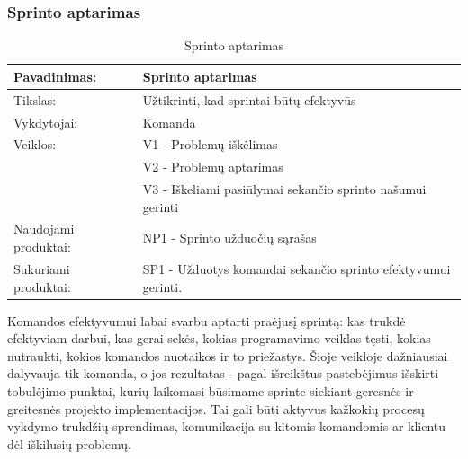 \documentclass{VUMIFPSkursinis}
\begin{document}
	\subsubsection{Sprinto aptarimas}
	\begin{center}
		\begin{table}[ht]
		\caption{Sprinto aptarimas}
		\begin{tabular}{ | l | l | } 
		\hline
		Pavadinimas:         & Sprinto aptarimas                               \\ \hline
		Tikslas: 	           & Užtikrinti, kad sprintai būtų efektyvūs\\ \hline
		Vykdytojai:          & Komanda                                \\ \hline
		Veiklos:             & V1 - Problemų iškėlimas 													\\ 
						             & V2 - Problemų aptarimas \\ 
					 	             & V3 - Iškeliami pasiūlymai sekančio sprinto našumui gerinti 																			 \\ \hline
		Naudojami produktai: & NP1 - Sprinto užduočių sąrašas 																																															 \\ \hline
		Sukuriami produktai: & SP1 - Užduotys komandai sekančio sprinto efektyvumui gerinti.																											\\ \hline
		\end{tabular}
	\end{table}
		\end{center}
	Komandos efektyvumui labai svarbu aptarti praėjusį sprintą: kas trukdė efektyviam darbui, kas gerai sekės, kokias programavimo veiklas tęsti, kokias nutraukti, kokios komandos nuotaikos ir to priežastys. Šioje veikloje dažniausiai dalyvauja tik komanda, o jos rezultatas - pagal išreikštus pastebėjimus išskirti tobulėjimo punktai, kurių laikomasi būsimame sprinte siekiant geresnės ir greitesnės projekto implementacijos. Tai gali būti aktyvus kažkokių procesų vykdymo trukdžių sprendimas, komunikacija su kitomis komandomis ar klientu dėl iškilusių problemų.
\end{document}
